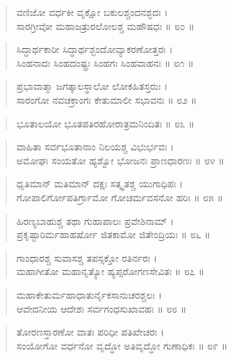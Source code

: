 \begin{verse}
ವಣಿಜೋ ವರ್ಧಕೀ ವೃಕ್ಷೋ ಬಕುಲಶ್ಚಂದನಶ್ಛದಃ ।\\ಸಾರಗ್ರೀವೋ ಮಹಾಜತ್ರುರಲೋಲಶ್ಚ ಮಹೌಷಧಃ \num{॥ ೮೦ ॥}
\end{verse}

\begin{verse}
ಸಿದ್ಧಾರ್ಥಕಾರೀ ಸಿದ್ಧಾರ್ಥಶ್ಛಂದೋವ್ಯಾಕರಣೋತ್ತರಃ ।\\ಸಿಂಹನಾದಃ ಸಿಂಹದಂಷ್ಟ್ರಃ ಸಿಂಹಗಃ ಸಿಂಹವಾಹನಃ \num{॥ ೮೧ ॥}
\end{verse}

\begin{verse}
ಪ್ರಭಾವಾತ್ಮಾ ಜಗತ್ಕಾಲಸ್ಥಾಲೋ ಲೋಕಹಿತಸ್ತರುಃ ।\\ಸಾರಂಗೋ ನವಚಕ್ರಾಂಗಃ ಕೇತುಮಾಲೀ ಸಭಾವನಃ \num{॥ ೮೨ ॥}
\end{verse}

\begin{verse}
ಭೂತಾಲಯೋ ಭೂತಪತಿರಹೋರಾತ್ರಮನಿಂದಿತಃ \num{॥ ೮೩ ॥}
\end{verse}

\begin{verse}
ವಾಹಿತಾ ಸರ್ವಭೂತಾನಾಂ ನಿಲಯಶ್ಚ ವಿಭುರ್ಭವಃ ।\\ಅಮೋಘಃ ಸಂಯತೋ ಹ್ಯಶ್ವೋ ಭೋಜನಃ ಪ್ರಾಣಧಾರಣಃ \num{॥ ೮೪ ॥}
\end{verse}

\begin{verse}
ಧೃತಿಮಾನ್ ಮತಿಮಾನ್ ದಕ್ಷಃ ಸತ್ಕೃತಶ್ಚ ಯುಗಾಧಿಪಃ ।\\ಗೋಪಾಲಿರ್ಗೋಪತಿರ್ಗ್ರಾಮೋ ಗೋಚರ್ಮವಸನೋ ಹರಿಃ \num{॥ ೮೫ ॥}
\end{verse}

\begin{verse}
ಹಿರಣ್ಯಬಾಹುಶ್ಚ ತಥಾ ಗುಹಾಪಾಲಃ ಪ್ರವೇಶಿನಾಮ್ ।\\ಪ್ರಕೃಷ್ಟಾರಿರ್ಮಹಾಹರ್ಷೋ ಜಿತಕಾಮೋ ಜಿತೇಂದ್ರಿಯಃ \num{॥ ೮೬ ॥}
\end{verse}

\begin{verse}
ಗಾಂಧಾರಶ್ಚ ಸುವಾಸಶ್ಚ ತಪಸ್ಸಕ್ತೋ ರತಿರ್ನರಃ ।\\ಮಹಾಗೀತೋ ಮಹಾನೃತ್ಯೋ ಹ್ಯಪ್ಸರೋಗಣಸೇವಿತಃ \num{॥ ೮೭ ॥}
\end{verse}

\begin{verse}
ಮಹಾಕೇತುರ್ಮಹಾಧಾತುರ್ನೈಕಸಾನುಚರಶ್ಚಲಃ ।\\ಆವೇದನೀಯ ಆದೇಶಃ ಸರ್ವಗಂಧಸುಖಾವಹಃ \num{॥ ೮೮ ॥}
\end{verse}

\begin{verse}
ತೋರಣಸ್ತಾರಣೋ ವಾತಃ ಪರಿಧೀ ಪತಿಖೇಚರಃ ।\\ಸಂಯೋಗೋ ವರ್ಧನೋ ವೃದ್ಧೋ ಅತಿವೃದ್ಧೋ ಗುಣಾಧಿಕಃ \num{॥ ೮೯ ॥}
\end{verse}

